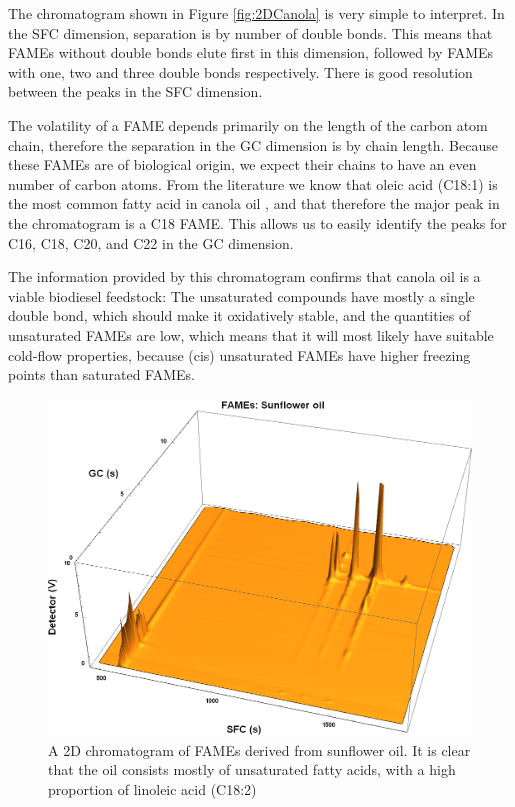 The chromatogram shown in Figure \ref{fig:2DCanola} is very simple to interpret.
In the SFC dimension, separation is by number of double bonds.
This means that FAMEs without double bonds elute first in this dimension,
followed by FAMEs with one, two and three double bonds respectively. There is
good resolution between the peaks in the SFC dimension.

The volatility of a FAME depends primarily on the length of the carbon atom
chain, therefore the separation in the GC dimension is by chain length. Because
these FAMEs are of biological origin, we expect their chains to have an even
number of carbon atoms. From the literature we know that oleic acid (C18:1) is
the most common fatty acid in canola oil \autocite{JFAOWHOCAC2019}, and that
therefore the major peak in the chromatogram is a C18 FAME. This allows us to
easily identify the peaks for C16, C18, C20, and C22 in the GC dimension.

The information provided by this chromatogram confirms that canola oil is a
vi\-able bio\-diesel feedstock: The unsaturated compounds have mostly a single
double bond, which should make it oxidatively stable, and the quantities of
unsaturated FAMEs are low, which means that it will most likely have suitable
cold-flow properties, because (cis) unsaturated FAMEs have higher freezing
points than saturated FAMEs.

\begin{figure}
\centering
\includegraphics[width=\textwidth]{Figures/Sunflower.png}
\decoRule

\caption[SFC×GC of sunflower oil]{A 2D chromatogram of FAMEs derived from
sunflower oil. It is clear that the oil consists mostly of unsaturated fatty
acids, with a high proportion of linoleic acid (C18:2)}

\label{fig:2DSunflower}
\end{figure}

